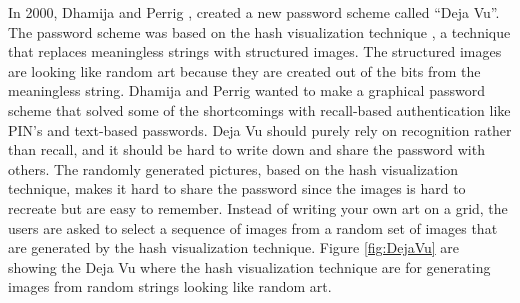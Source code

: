   In 2000, Dhamija and Perrig \cite{DejaVu}, created a new password scheme called ``Deja Vu''. The password scheme was based on the hash visualization technique \cite{HashVisualization}, a technique that replaces meaningless strings with structured images. The structured images are looking like random art because they are created out of the bits from the meaningless string. Dhamija and Perrig wanted to make a graphical password scheme that solved some of the shortcomings with recall-based authentication like PIN's and text-based passwords. Deja Vu should purely rely on recognition rather than recall, and it should be hard to write down and share the password with others. The randomly generated pictures, based on the hash visualization technique, makes it hard to share the password since the images is hard to recreate but are easy to remember. Instead of writing your own art on a grid, the users are asked to select a sequence of images from a random set of images that are generated by the hash visualization technique. Figure \ref{fig:DejaVu} are showing the Deja Vu where the hash visualization technique are for generating images from random strings looking like random art.

    \begin{figure}[H]
      \centering
    \end{figure}  

